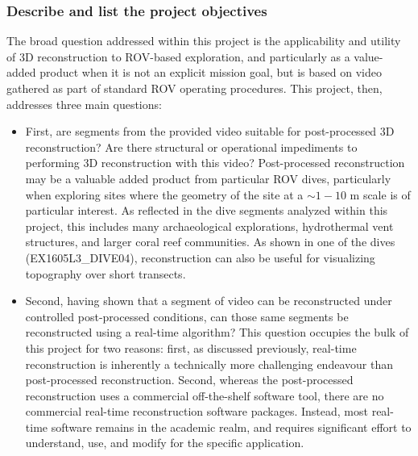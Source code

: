 \documentclass[letterpaper,12pt]{article}
\begin{document}
\subsubsection*{Describe and list the project objectives}

The broad question addressed within this project is the applicability and utility of 3D reconstruction to ROV-based exploration, and particularly as a value-added product when it is not an explicit mission goal, but is based on video gathered as part of standard ROV operating procedures.  This project, then, addresses three main questions:

\begin{itemize}
    \item First, are segments from the provided video suitable for post-processed 3D reconstruction?   Are there structural or operational impediments to performing 3D reconstruction with this video?   Post-processed reconstruction may be a valuable added product from particular ROV dives, particularly when exploring sites where the geometry of the site at a $\sim 1-10$ m scale is of particular interest.  As reflected in the dive segments analyzed within this project, this includes many archaeological explorations,  hydrothermal vent structures, and larger coral reef communities.   As shown in one of the dives (EX1605L3\_DIVE04), reconstruction can also be useful for visualizing topography over short transects.
    
    \item Second, having shown that a segment of video can be reconstructed under controlled post-processed conditions, can those same segments be reconstructed using a real-time algorithm?   This question occupies the bulk of this project for two reasons:  first, as discussed previously, real-time reconstruction is inherently a technically more challenging endeavour than post-processed reconstruction.  Second, whereas the post-processed reconstruction uses a commercial off-the-shelf software tool, there are no commercial real-time reconstruction software packages.  Instead, most real-time software remains in the academic realm, and requires significant effort to understand, use, and modify for the specific application.  


\end{itemize}
\end{document}
